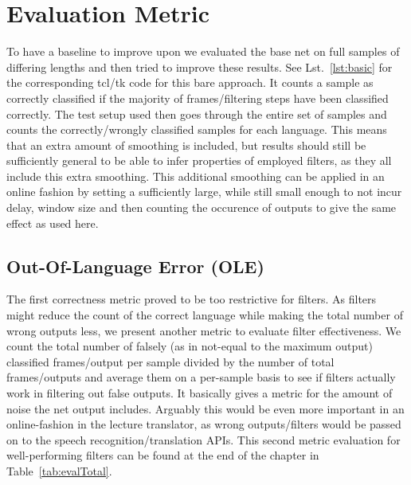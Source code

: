 \section{Evaluation Metric}
\label{sec:eval:bare}

To have a baseline to improve upon we evaluated the base net on full samples of differing lengths and then tried to improve these results. See Lst.~\ref{lst:basic} for the corresponding tcl/tk code for this bare approach. It counts a sample as correctly classified if the majority of frames/filtering steps have been classified correctly. The test setup used then goes through the entire set of samples and counts the correctly/wrongly classified samples for each language. This means that an extra amount of smoothing is included, but results should still be sufficiently general to be able to infer properties of employed filters, as they all include this extra smoothing.  This additional smoothing can be applied in an online fashion by setting a sufficiently large, while still small enough to not incur delay, window size and then counting the occurence of outputs to give the same effect as used here. 

\subsection{Out-Of-Language Error (OLE)}
\label{sec:eval:ole}

The first correctness metric proved to be too restrictive for filters. As filters might reduce the count of the correct language while making the total number of wrong outputs less, we present another metric to evaluate filter effectiveness. We count the total number of falsely (as in not-equal to the maximum output) classified frames/output per sample divided by the number of total frames/outputs and average them on a per-sample basis to see if filters actually work in filtering out false outputs. It basically gives a metric for the amount of noise the net output includes. Arguably this would be even more important in an online-fashion in the lecture translator, as wrong outputs/filters would be passed on to the speech recognition/translation APIs. This second metric evaluation for well-performing filters can be found at the end of the chapter in Table~\ref{tab:evalTotal}.

